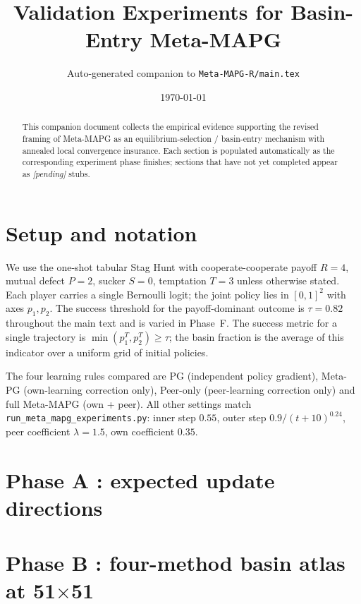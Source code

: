 \documentclass[11pt]{article}
\title{Validation Experiments for Basin-Entry Meta-MAPG}
\author{Auto-generated companion to \texttt{Meta-MAPG-R/main.tex}}
\date{\today}
\begin{document}
\maketitle

\begin{abstract}
This companion document collects the empirical evidence supporting the
revised framing of Meta-MAPG as an equilibrium-selection / basin-entry
mechanism with annealed local convergence insurance. Each section is
populated automatically as the corresponding experiment phase finishes;
sections that have not yet completed appear as \emph{[pending]} stubs.
\end{abstract}

\tableofcontents

\section{Setup and notation}

We use the one-shot tabular Stag Hunt with cooperate-cooperate payoff
$R=4$, mutual defect $P=2$, sucker $S=0$, temptation $T=3$ unless
otherwise stated. Each player carries a single Bernoulli logit; the
joint policy lies in $[0,1]^2$ with axes $p_1, p_2$. The success
threshold for the payoff-dominant outcome is $\tau=0.82$ throughout the
main text and is varied in Phase~F. The success metric for a single
trajectory is $\min(p_1^T, p_2^T) \ge \tau$; the basin fraction is the
average of this indicator over a uniform grid of initial policies.

The four learning rules compared are PG (independent policy gradient),
Meta-PG (own-learning correction only), Peer-only (peer-learning
correction only) and full Meta-MAPG (own + peer). All other settings
match \texttt{run\_meta\_mapg\_experiments.py}: inner step $0.55$,
outer step $0.9 / (t+10)^{0.24}$, peer coefficient $\lambda=1.5$, own
coefficient $0.35$.

\section{Phase A : expected update directions}\label{sec:phase-a}



\section{Phase B : four-method basin atlas at 51$\times$51}\label{sec:phase-b}
\end{document}
